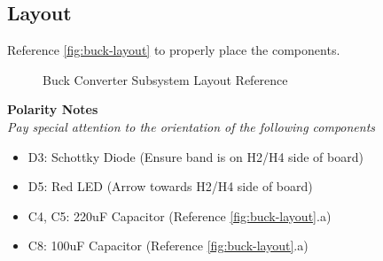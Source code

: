\documentclass{article}
\begin{document}
\subsection{Layout}

Reference \autoref{fig:buck-layout} to properly place the components.

\begin{figure}[H]
    \centering
        \qquad
        \caption{Buck Converter Subsystem Layout Reference}%
    \label{fig:buck-layout}%
\end{figure}

\noindent \textbf{Polarity Notes}\\
\noindent \textit{Pay special attention to the orientation of the following components}
\begin{itemize}
  \item D3: Schottky Diode (Ensure band is on H2/H4 side of board)
  \item D5: Red LED (Arrow towards H2/H4 side of board) 
  \item C4, C5: 220uF Capacitor (Reference \autoref{fig:buck-layout}.a) 
  \item C8: 100uF Capacitor (Reference \autoref{fig:buck-layout}.a)
\end{itemize}
\end{document}
